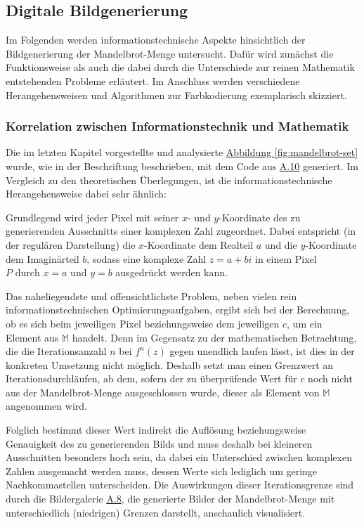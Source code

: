 \subsection{Digitale Bildgenerierung}\label{subsec:digital-generation}

Im Folgenden werden informationstechnische Aspekte hinsichtlich der Bildgenerierung
der Mandelbrot-Menge untersucht.
Dafür wird zunächst die Funktionsweise als auch die dabei durch die Unterschiede
zur reinen Mathematik entstehenden Probleme erläutert.
Im Anschluss werden verschiedene Herangehensweisen und Algorithmen zur Farbkodierung
exemplarisch skizziert.

\subsubsection{Korrelation zwischen Informationstechnik und Mathematik}
\label{subsubsec:correlation-between-it-and-mathematics}

Die im letzten Kapitel vorgestellte und analysierte \hyperref[fig:mandelbrot-set]
{Abbildung \ref{fig:mandelbrot-set}} wurde,
wie in der Beschriftung beschrieben, mit dem Code aus \hyperref[app:10]{A.10}
generiert.
Im Vergleich zu den theoretischen Überlegungen, ist die
informationstechnische Herangehensweise dabei sehr ähnlich:

Grundlegend wird jeder Pixel mit seiner $x$- und $y$-Koordinate des zu generierenden
Ausschnitts einer komplexen Zahl zugeordnet.
Dabei entspricht (in der regulären Darstellung) die $x$-Koordinate dem Realteil
$a$ und die $y$-Koordinate dem Imagin\"arteil $b$, sodass eine komplexe Zahl
$z = a + bi$ in einem Pixel $P \text{ durch } x = a \text{ und } y = b$ ausgedrückt
werden kann.

Das naheliegendste und offensichtlichste Problem,
neben vielen rein informationstechnischen Optimierungsaufgaben,
ergibt sich bei der Berechnung, ob es sich beim jeweiligen Pixel
beziehungsweise dem jeweiligen $c$, um ein Element aus
$\mathbb{M}$ handelt.
Denn im Gegensatz zu der mathematischen Betrachtung, die die Iterationsanzahl
$n$ bei $f^n(z)$ gegen unendlich laufen lässt, ist dies in der konkreten Umsetzung
nicht möglich.
Deshalb setzt man einen Grenzwert an Iterationsdurchläufen, ab dem, sofern der zu
überprüfende Wert für $c$ noch nicht aus der Mandelbrot-Menge ausgeschlossen wurde,
dieser als Element von $\mathbb{M}$ angenommen wird.

Folglich bestimmt dieser Wert indirekt die Auflösung beziehungsweise Genauigkeit
des zu generierenden Bilds und muss deshalb bei kleineren Ausschnitten besonders
hoch sein, da dabei ein Unterschied zwischen komplexen Zahlen ausgemacht werden
muss, dessen Werte sich lediglich um geringe Nachkommastellen unterscheiden.
Die Auswirkungen dieser Iterationsgrenze sind durch die Bildergalerie
\hyperref[app:8]{A.8}, die generierte Bilder der Mandelbrot-Menge
mit unterschiedlich (niedrigen) Grenzen darstellt, anschaulich visualisiert.

